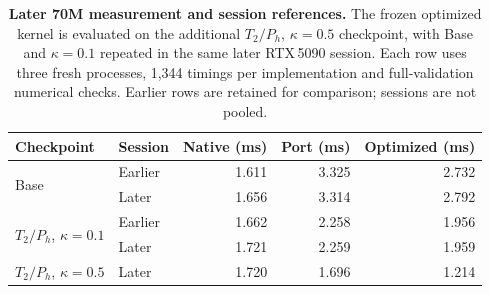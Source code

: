 \begin{table}[!htbp]
\centering\small
\setlength{\tabcolsep}{5pt}
\caption{\textbf{Later 70M measurement and session references.} The frozen optimized kernel is evaluated on the additional $T_2/P_h$, $\kappa=0.5$ checkpoint, with Base and $\kappa=0.1$ repeated in the same later RTX\,5090 session. Each row uses three fresh processes, 1,344 timings per implementation and full-validation numerical checks. Earlier rows are retained for comparison; sessions are not pooled.}
\label{tab:70m-additional-endpoint}
\begin{tabular}{@{}llrrr@{}}
\toprule
Checkpoint & Session & Native (ms) & Port (ms) & Optimized (ms) \\
\midrule
\multirow{2}{*}{Base} & Earlier & 1.611 & 3.325 & 2.732 \\
 & Later & 1.656 & 3.314 & 2.792 \\
\midrule
\multirow{2}{*}{$T_2/P_h$, $\kappa=0.1$} & Earlier & 1.662 & 2.258 & 1.956 \\
 & Later & 1.721 & 2.259 & 1.959 \\
\midrule
$T_2/P_h$, $\kappa=0.5$ & Later & 1.720 & 1.696 & 1.214 \\
\bottomrule
\end{tabular}
\end{table}
